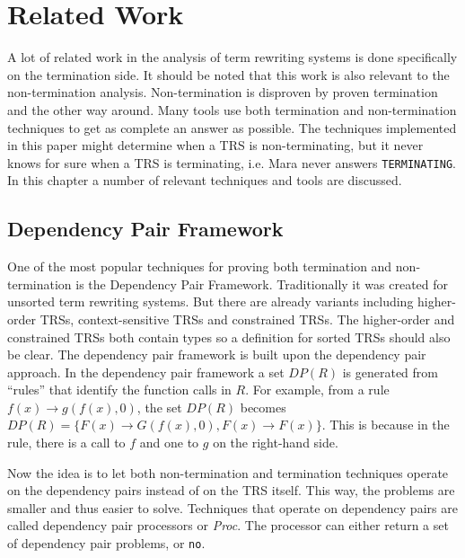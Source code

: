 \newcommand\TTTT{%
 \textsf{T\kern-0.15em\raisebox{-0.55ex}T\kern-0.15emT\kern-0.15em\raisebox{-0.55ex}2\kern.15em}%
}
\newcommand\TTT{%
 \textsf{T\kern-0.15em\raisebox{-0.55ex}T\kern-0.15emT}%
}

\chapter{Related Work}\label{relatedwork}
A lot of related work in the analysis of term rewriting systems is done specifically on the termination side. It should be noted that this work is also relevant to the non-termination analysis. Non-termination is disproven by proven termination and the other way around. Many tools use both termination and non-termination techniques to get as complete an answer as possible. The techniques implemented in this paper might determine when a TRS is non-terminating, but it never knows for sure when a TRS is terminating, i.e. Mara never answers \texttt{TERMINATING}. In this chapter a number of relevant techniques and tools are discussed.

\section{Dependency Pair Framework}
One of the most popular techniques for proving both termination and non-termination is the Dependency Pair Framework\cite{thiemann2007dp}. Traditionally it was created for unsorted term rewriting systems. But there are already variants including higher-order TRSs, context-sensitive TRSs and constrained TRSs. The higher-order and constrained TRSs both contain types so a definition for sorted TRSs should also be clear. The dependency pair framework is built upon the dependency pair approach\cite{arts2000termination}. In the dependency pair framework a set $DP(R)$ is generated from ``rules'' that identify the function calls in $R$. For example, from a rule $f(x) \rightarrow g(f(x), 0)$, the set $DP(R)$ becomes $DP(R) = \{ F(x) \rightarrow G(f(x), 0), F(x) \rightarrow F(x) \}$. This is because in the rule, there is a call to $f$ and one to $g$ on the right-hand side.

Now the idea is to let both non-termination and termination techniques operate on the dependency pairs instead of on the TRS itself. This way, the problems are smaller and thus easier to solve. Techniques that operate on dependency pairs are called dependency pair processors or \textit{Proc}. The processor can either return a set of dependency pair problems, or \texttt{no}. 

